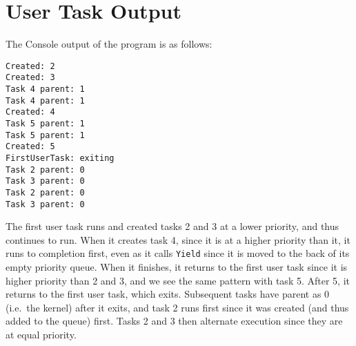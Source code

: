 \documentclass[12pt]{article}
\begin{document}
    \section{User Task Output}
    The Console output of the program is as follows:
    \begin{verbatim}
Created: 2
Created: 3
Task 4 parent: 1
Task 4 parent: 1
Created: 4
Task 5 parent: 1
Task 5 parent: 1
Created: 5
FirstUserTask: exiting
Task 2 parent: 0
Task 3 parent: 0
Task 2 parent: 0
Task 3 parent: 0
    \end{verbatim}
    The first user task runs and created tasks 2 and 3 at a lower priority, and thus continues to run. When it creates task 4, since it is at a higher priority than it, it runs to completion first, even as it calls \verb`Yield` since it is moved to the back of its empty priority queue. When it finishes, it returns to the first user task since it is higher priority than 2 and 3, and we see the same pattern with task 5. After 5, it returns to the first user task, which exits. Subsequent tasks have parent as 0 (i.e.\ the kernel) after it exits, and task 2 runs first since it was created (and thus added to the queue) first. Tasks 2 and 3 then alternate execution since they are at equal priority.
\end{document}

